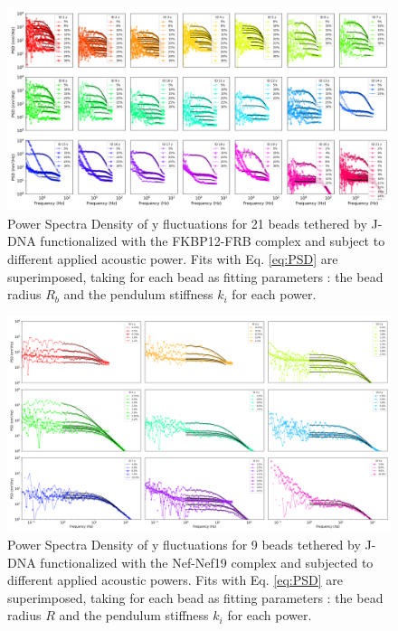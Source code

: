 \documentclass{biophys-new}
\begin{document}
\begin{figure}
	\centering
	\centerline {\includegraphics[width=1\linewidth]{Figures/multispectrumy_Rapa.png}}
	\caption{Power Spectra Density of y fluctuations for 21 beads tethered by J-DNA functionalized with the FKBP12-FRB complex and subject to different applied acoustic power. Fits with Eq. \ref{eq:PSD} are superimposed, taking for each bead as fitting parameters : the bead radius $R_b$ and the pendulum stiffness $k_i$ for each power.}
	\label{fig:FitSpectra_y}
\end{figure}

\begin{figure}[hbt!]
	\centering
	\centerline {\includegraphics[width=1\linewidth]{Figures/multispectrumy_Nef.png}}
	\caption{%
	Power Spectra Density of y fluctuations for 9 beads tethered by J-DNA functionalized with the Nef-Nef19 complex and subjected to different applied acoustic powers. Fits with Eq. \ref{eq:PSD} are superimposed, taking for each bead as fitting parameters : the bead radius $R$ and the pendulum stiffness $k_i$ for each power.}
	\label{fig:FitSpectraNef}	
\end{figure}
\end{document}
